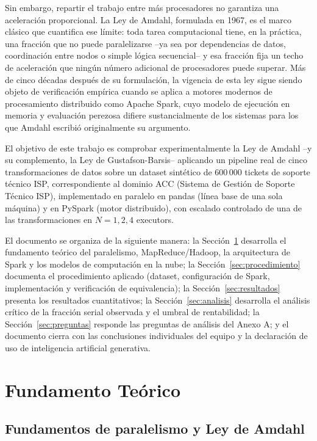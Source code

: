 \documentclass[11pt,a4paper]{article}
\begin{document}
Sin embargo, repartir el trabajo entre m\'as procesadores no garantiza una
aceleraci\'on proporcional. La Ley de Amdahl, formulada en 1967, es el marco
cl\'asico que cuantifica ese l\'imite: toda tarea computacional tiene, en la
pr\'actica, una fracci\'on que no puede paralelizarse --ya sea por
dependencias de datos, coordinaci\'on entre nodos o simple l\'ogica
secuencial-- y esa fracci\'on fija un techo de aceleraci\'on que ning\'un
n\'umero adicional de procesadores puede superar. M\'as de cinco d\'ecadas
despu\'es de su formulaci\'on, la vigencia de esta ley sigue siendo objeto de
verificaci\'on emp\'irica cuando se aplica a motores modernos de
procesamiento distribuido como Apache Spark, cuyo modelo de ejecuci\'on en
memoria y evaluaci\'on perezosa difiere sustancialmente de los sistemas para
los que Amdahl escribi\'o originalmente su argumento.

El objetivo de este trabajo es comprobar experimentalmente la Ley de Amdahl
--y su complemento, la Ley de Gustafson-Barsis-- aplicando un pipeline real
de cinco transformaciones de datos sobre un dataset sint\'etico de 600\,000
tickets de soporte t\'ecnico ISP, correspondiente al dominio ACC (Sistema de
Gesti\'on de Soporte T\'ecnico ISP), implementado en paralelo en pandas
(l\'inea base de una sola m\'aquina) y en PySpark (motor distribuido), con
escalado controlado de una de las transformaciones en $N=1,2,4$ executors.

El documento se organiza de la siguiente manera: la Secci\'on~\ref{sec:fundamento}
desarrolla el fundamento te\'orico del paralelismo, MapReduce/Hadoop, la
arquitectura de Spark y los modelos de computaci\'on en la nube; la
Secci\'on~\ref{sec:procedimiento} documenta el procedimiento aplicado
(dataset, configuraci\'on de Spark, implementaci\'on y verificaci\'on de
equivalencia); la Secci\'on~\ref{sec:resultados} presenta los resultados
cuantitativos; la Secci\'on~\ref{sec:analisis} desarrolla el an\'alisis
cr\'itico de la fracci\'on serial observada y el umbral de rentabilidad; la
Secci\'on~\ref{sec:preguntas} responde las preguntas de an\'alisis del Anexo
A; y el documento cierra con las conclusiones individuales del equipo y la
declaraci\'on de uso de inteligencia artificial generativa.

\section{Fundamento Te\'orico}
\label{sec:fundamento}

\subsection{Fundamentos de paralelismo y Ley de Amdahl}
\label{sec:fundamento-amdahl}
\end{document}
